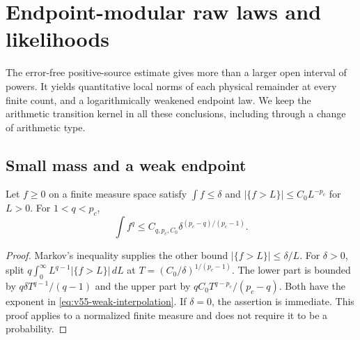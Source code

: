 \section{Endpoint-modular raw laws and likelihoods}
\label{sec:v55-endpoint-laws}
The error-free positive-source estimate gives more than a larger open
interval of powers. It yields quantitative local norms of each
physical remainder at every finite count, and a logarithmically
weakened endpoint law. We keep the arithmetic transition kernel in
all these conclusions, including through a change of arithmetic type.

\subsection{Small mass and a weak endpoint}
\begin{lemma}
\label{lem:v55-weak-interpolation}
Let $f\ge0$ on a finite measure space satisfy
$\int f\le\delta$ and
$|\{f>L\}|\le C_0L^{-p_c}$ for $L>0$. For $1<q<p_c$,
\begin{equation}\label{eq:v55-weak-interpolation}
 \int f^q\le C_{q,p_c,C_0}
                 \delta^{(p_c-q)/(p_c-1)}.
\end{equation}
\end{lemma}
\begin{proof}
Markov's inequality supplies the other bound
$|\{f>L\}|\le\delta/L$. For $\delta>0$, split
$q\int_0^\infty L^{q-1}|\{f>L\}|\,dL$ at
$T=(C_0/\delta)^{1/(p_c-1)}$. The lower part is bounded by
$q\delta T^{q-1}/(q-1)$ and the upper part by
$qC_0T^{q-p_c}/(p_c-q)$. Both have the exponent in
\eqref{eq:v55-weak-interpolation}. If $\delta=0$, the assertion is
immediate. This proof applies to a normalized finite measure and does
not require it to be a probability.
\end{proof}


